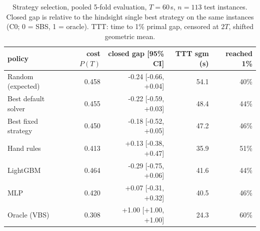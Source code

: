 \begin{table}[t]\centering\small
\begin{tabular}{lrrrr}
\toprule
policy & cost $P(T)$ & closed gap [95\% CI] & TTT sgm (s) & reached 1\% \\
\midrule
Random (expected) & 0.458 & -0.24 [-0.66, +0.04] & 54.1 & 40\% \\
Best default solver & 0.455 & -0.22 [-0.59, +0.03] & 48.4 & 44\% \\
Best fixed strategy & 0.450 & -0.18 [-0.52, +0.05] & 47.2 & 46\% \\
Hand rules & 0.413 & +0.13 [-0.38, +0.47] & 35.9 & 51\% \\
LightGBM & 0.464 & -0.29 [-0.75, +0.06] & 41.6 & 44\% \\
MLP & 0.420 & +0.07 [-0.31, +0.32] & 40.5 & 46\% \\
Oracle (VBS) & 0.308 & +1.00 [+1.00, +1.00] & 24.3 & 60\% \\
\bottomrule
\end{tabular}
\caption{Strategy selection, pooled 5-fold evaluation, $T=60$\,s, $n=113$ test instances. Closed gap is relative to the hindsight single best strategy on the same instances (C0; 0 = SBS, 1 = oracle). TTT: time to 1\% primal gap, censored at $2T$, shifted geometric mean.}\label{tab:sel-pooled-60}
\end{table}